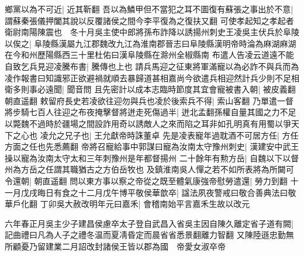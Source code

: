 鄉黨以為不可近|{
	近其靳翻}
吾以為鱗甲但不當犯之耳不圖復有蘇張之事出於不意|{
	謂蘇秦張儀押闔其說以反覆諸侯之間今李平復為之復扶又翻}
可使孝起知之孝起者衛尉南陽陳震也　冬十月吳主使中郎將孫布詐降以誘揚州刺史王凌吳主伏兵於阜陵以俟之|{
	阜陵縣漢屬九江郡魏改九江為淮南郡晉志曰阜陵縣漢明帝時淪為麻湖麻湖在今和州歷陽縣西三十里杜佑曰漢阜陵縣在滁州全椒縣南}
布遣人告凌云道遠不能自致乞兵見迎凌騰布書|{
	騰傳也上也}
請兵馬迎之征東將軍滿寵以為必詐不與兵而為凌作報書曰知識邪正欲避禍就順去暴歸道甚相嘉尚今欲遣兵相迎然計兵少則不足相衛多則事必遠聞|{
	聞音問}
且先密計以成本志臨時節度其宜會寵被書入朝|{
	被皮義翻朝直遥翻}
敕留府長史若凌欲往迎勿與兵也凌於後索兵不得|{
	索山客翻}
乃單遣一督將步騎七百人往迎之布夜掩擊督將迸走死傷過半|{
	迸北孟翻孫權自量其國之力不足以斃魏不過時於疆場之間設詐用奇以誘敵人之來而陷之耳非如孔明真有用蜀以爭天下之心也}
凌允之兄子也|{
	王允獻帝時誅董卓}
先是凌表寵年過耽酒不可居方任|{
	方任方面之任也先悉薦翻}
帝將召寵給事中郭謀曰寵為汝南太守豫州刺史|{
	漢建安中武王操以寵為汝南太守太和三年刺豫州是年都督揚州}
二十餘年有勲方岳|{
	自魏以下以督州為方岳之任謂其職猶古之方伯岳牧也}
及鎮淮南吳人憚之若不如所表將為所闚可令還朝|{
	朝直遥翻}
問以東方事以察之帝從之既至體氣康強帝慰勞遣還|{
	勞力到翻}
十一月戊戌晦日有食之十二月戊午博平敬侯華歆卒|{
	諡法夙夜警戒曰敬合善典法曰敬華戶化翻}
丁卯吳大赦改明年元曰嘉禾|{
	會稽南始平言嘉禾生故以改元}


六年春正月吳主少子建昌侯慮卒太子登自武昌入省吳主因自陳久離定省子道有闕|{
	記曲禮曰凡為人子之禮冬温而夏凊昏定而晨省省悉景翻離力智翻}
又陳陸遜忠勤無所顧憂乃留建業二月詔改封諸侯王皆以郡為國　帝愛女淑卒帝

